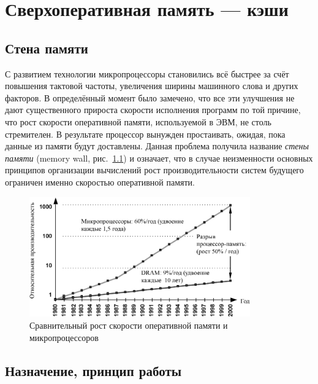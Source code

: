 \chapter{Сверхоперативная память --- кэши}\label{caches}


\section{Стена памяти}

С развитием технологии микропроцессоры становились всё быстрее за счёт повышения тактовой частоты, увеличения ширины машинного слова и других факторов. В определённый момент было замечено, что все эти улучшения не дают существенного прироста скорости исполнения программ по той причине, что рост скорости оперативной памяти, используемой в ЭВМ, не столь стремителен. В результате процессор вынужден простаивать, ожидая, пока данные из памяти будут доставлены. Данная проблема получила название \textit{стены памяти} (\abbr memory wall, рис.~\ref{fig:mem-wall}) и означает, что в случае неизменности основных принципов организации вычислений рост производительности систем будущего ограничен именно скоростью оперативной памяти. 

\begin{figure}[htb]
    \centering
    \includegraphics[width=0.85\textwidth]{./mem-wall-crop.pdf}
    \caption{Сравнительный рост скорости оперативной памяти и микропроцессоров}
    \label{fig:mem-wall}
\end{figure}

\section{Назначение, принцип работы}

